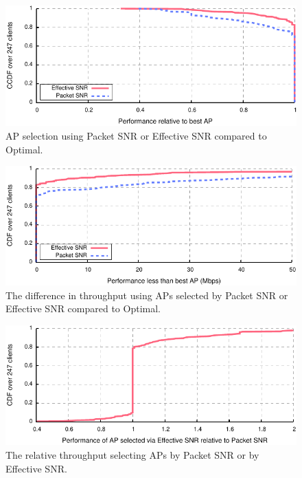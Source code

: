 \begin{figure}[p]
	\centering
	\includegraphics[width=\textwidth]{figures/applications/ap_sel_ratio_opt.pdf}
	\caption{\label{fig:ap_sel_ratio_opt}AP selection using Packet SNR or Effective SNR compared to Optimal.}
\end{figure}

\begin{figure}[p]
	\centering
	\includegraphics[width=\textwidth]{figures/applications/ap_sel_diff_opt.pdf}
	\caption{\label{fig:ap_sel_delta_opt}The difference in throughput using APs selected by Packet SNR or Effective SNR compared to Optimal.}
\end{figure}

\begin{figure}[p]
	\centering
	\includegraphics[width=\textwidth]{figures/applications/ap_sel_ratio.pdf}
	\caption{\label{fig:ap_sel_ratio}The relative throughput selecting APs by Packet SNR or by Effective SNR\@.}
\end{figure}

